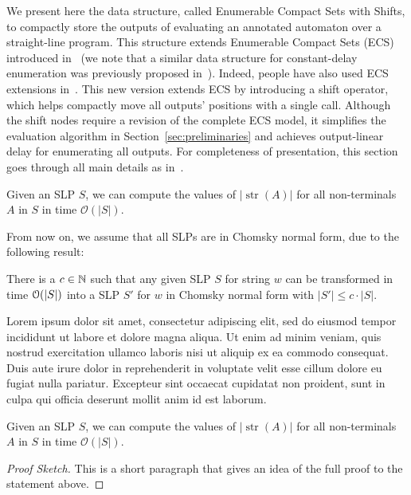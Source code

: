 
We present here the data structure, called Enumerable Compact Sets with Shifts, to compactly store the outputs of evaluating an annotated automaton over a straight-line program. This structure extends Enumerable Compact Sets (ECS) introduced in~\cite{DurandG07} (we note that a similar data structure for constant-delay enumeration was previously proposed in~\cite{BaganDG07}). Indeed, people have also used ECS extensions in~\cite{DurandG07,BucchiGQRV22}. This new version extends ECS by introducing a shift operator, which helps compactly move all outputs' positions with a single call. Although the shift nodes require a revision of the complete ECS model, it simplifies the evaluation algorithm in Section~\ref{sec:preliminaries} and achieves output-linear delay for enumerating all outputs. For completeness of presentation, this section goes through all main details as in~\cite{BaganDG07}.

\begin{lemma}\label{lemma:mylemma}
	Given an SLP $S$, we can compute the values of $|\operatorname{str}(A)|$ for all non-terminals $A$ in $S$ in time $\mathcal{O}(|S|)$.		
\end{lemma}

From now on, we assume that all SLPs are in Chomsky normal form, due to the following result:

\begin{theorem} \label{theo:mytheorem}
	There is a $c\in\mathbb{N}$ such that any given SLP $S$ for string $w$ can be transformed in time $\mathcal{O}(|S|)$ into a SLP $S'$ for $w$ in Chomsky normal form with $|S'| \leq c\cdot|S|$.
\end{theorem}

Lorem ipsum dolor sit amet, consectetur adipiscing elit, sed do eiusmod tempor incididunt ut labore et dolore magna aliqua. Ut enim ad minim veniam, quis nostrud exercitation ullamco laboris nisi ut aliquip ex ea commodo consequat. Duis aute irure dolor in reprehenderit in voluptate velit esse cillum dolore eu fugiat nulla pariatur. Excepteur sint occaecat cupidatat non proident, sunt in culpa qui officia deserunt mollit anim id est laborum.

\begin{proposition}\label{prop:myproposition}
	Given an SLP $S$, we can compute the values of $|\operatorname{str}(A)|$ for all non-terminals $A$ in $S$ in time $\mathcal{O}(|S|)$.		
\end{proposition}
\begin{proof}[Proof Sketch]
	This is a short paragraph that gives an idea of the full proof to the statement above.
\end{proof}

